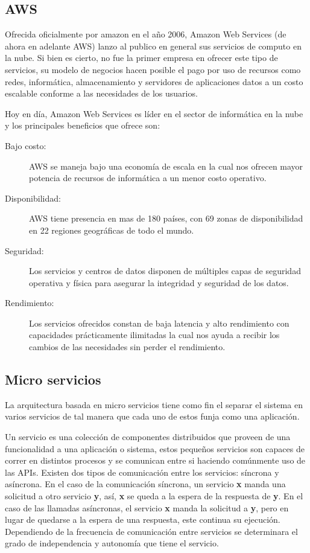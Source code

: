     \subsection{AWS}
        
        Ofrecida oficialmente por amazon en el año 2006, Amazon Web Services (de ahora en adelante AWS) lanzo al publico en general sus servicios de computo en la nube.
        Si bien es cierto, no fue la primer empresa en ofrecer este tipo de servicios, su modelo de negocios hacen posible el pago por uso de recursos como redes, informática, almacenamiento y servidores de aplicaciones datos a un costo escalable conforme a las necesidades de los usuarios.
    
        Hoy en día, Amazon Web Services es líder en el sector de informática en la nube y los principales beneficios que ofrece son:
        \begin{description}
                \item[Bajo costo:]AWS se maneja bajo una economía de escala en la cual nos ofrecen mayor potencia de recursos de informática a un menor costo operativo. 
                \item[Disponibilidad:]AWS tiene presencia en mas de 180 países, con 69 zonas de disponibilidad en 22 regiones geográficas de todo el mundo. 
                \item[Seguridad:] Los servicios y centros de datos disponen de múltiples capas de seguridad operativa y física para asegurar la integridad y seguridad de los datos.
                \item[Rendimiento:] Los servicios ofrecidos constan de baja latencia y alto rendimiento con capacidades prácticamente ilimitadas la cual nos ayuda a recibir los cambios de las necesidades sin perder el rendimiento.
        \end{description}
       

    \subsection{Micro servicios}
    La arquitectura basada en micro servicios tiene como fin el separar el sistema en varios servicios de tal manera que cada uno de estos funja como una aplicación.
    
    Un servicio es una colección de componentes distribuidos que proveen de una funcionalidad a una aplicación o sistema, estos pequeños servicios son capaces de correr en distintos procesos y se comunican entre si haciendo comúnmente uso de las APIs. Existen dos tipos de comunicación entre los servicios: síncrona y asíncrona. En el caso de la comunicación síncrona, un servicio \textbf{x} manda una solicitud a otro servicio \textbf{y}, así, \textbf{x} se queda a la espera de la respuesta de \textbf{y}. En el caso de las llamadas asíncronas, el servicio \textbf{x} manda la solicitud a \textbf{y}, pero en lugar de quedarse a la espera de una respuesta, este continua su ejecución. Dependiendo de la frecuencia de comunicación entre servicios se determinara el grado de independencia y autonomía que tiene el servicio.
    
